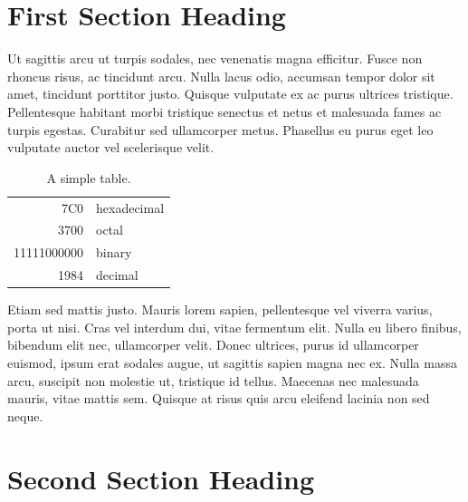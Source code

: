 \documentclass{acmsiggraph} %
\begin{document}

%
%


\keywordlist

\conceptlist

\printcopyright

\section{First Section Heading}

Ut sagittis arcu ut turpis sodales, nec venenatis magna efficitur. Fusce non rhoncus risus, ac tincidunt arcu. Nulla lacus odio, accumsan tempor dolor sit amet, tincidunt porttitor justo. Quisque vulputate ex ac purus ultrices tristique. Pellentesque habitant morbi tristique senectus et netus et malesuada fames ac turpis egestas. Curabitur sed ullamcorper metus. Phasellus eu purus eget leo vulputate auctor vel scelerisque velit.

\begin{table}[ht]
  \centering
  \caption{A simple table.}
  \begin{tabular}{|r|l|}
    \hline
    7C0 & hexadecimal \\
    3700 & octal \\ \cline{2-2}
    11111000000 & binary \\
    \hline \hline
    1984 & decimal \\
    \hline
  \end{tabular}
\end{table}
  
Etiam sed mattis justo. Mauris lorem sapien, pellentesque vel viverra varius, porta ut nisi. Cras vel interdum dui, vitae fermentum elit. Nulla eu libero finibus, bibendum elit nec, ullamcorper velit. Donec ultrices, purus id ullamcorper euismod, ipsum erat sodales augue, ut sagittis sapien magna nec ex. Nulla massa arcu, suscipit non molestie ut, tristique id tellus. Maecenas nec malesuada mauris, vitae mattis sem. Quisque at risus quis arcu eleifend lacinia non sed neque.

\section{Second Section Heading}
\end{document}
